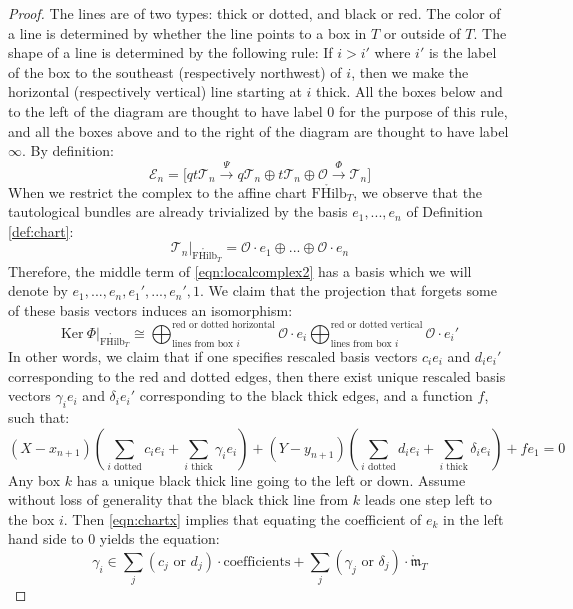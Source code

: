 \documentclass[12pt]{amsart}
\numberwithin{equation}{section}
\theoremstyle{definition}
\theoremstyle{remark}
\newcommand{\CE}{\mathcal{E}}
\newcommand{\CO}{\mathcal{O}}
\newcommand{\CT}{\mathcal{T}}
\renewcommand{\1}{\mathbf{1}}
\newcommand{\FH}{\mathrm{FHilb}}
\newcommand{\oFH}{\mathring{\FH}}
\newcommand{\fm}{\mathfrak{m}}
\newcommand{\ofm}{\mathring{\fm}}
\newcommand{\Ker}{\text{Ker}}
\begin{document}
\begin{proof}

\noindent The lines are of two types: thick or dotted, and black or red. The color of a line is determined by whether the line points to a box in $T$ or outside of $T$. The shape of a line is determined by the following rule: If $i>i'$ where $i'$ is the label of the box to the southeast (respectively northwest) of $i$, then we make the horizontal (respectively vertical) line starting at $i$ thick. All the boxes below and to the left of the diagram are thought to have label $0$ for the purpose of this rule, and all the boxes above and to the right of the diagram are thought to have label $\infty$. By definition:
\begin{equation}
\label{eqn:localcomplex2}
\CE_n = \Big[ qt\CT_{n} \stackrel{\Psi}\longrightarrow q \CT_n \oplus t \CT_n \oplus \CO \stackrel{\Phi}\longrightarrow \CT_n \Big]
\end{equation}
When we restrict the complex to the affine chart $\oFH_T$, we observe that the tautological bundles are already trivialized by the basis $e_1,...,e_n$ of Definition \ref{def:chart}:
$$
\CT_n |_{\oFH_T} = \CO \cdot e_1 \oplus ... \oplus \CO \cdot e_n
$$
Therefore, the middle term of \eqref{eqn:localcomplex2} has a basis which we will denote by $e_1,...,e_n, e_1',...,e_n',1$. We claim that the projection that forgets some of these basis vectors induces an isomorphism:
\begin{equation}
\label{eqn:localkernel}
\Ker \ \Phi|_{\oFH_T} \cong \bigoplus^{\text{red or dotted horizontal}}_{\text{lines from box }i} \CO \cdot e_i \bigoplus^{\text{red or dotted vertical}}_{\text{lines from box }i} \CO \cdot e_i'
\end{equation}
In other words, we claim that if one specifies rescaled basis vectors $c_i e_i$ and $d_i e_i'$ corresponding to the red and dotted edges, then there exist unique rescaled basis vectors $\gamma_i e_i$ and $\delta_i e_i'$ corresponding to the black thick edges, and a function $f$, such that:
$$
(X-x_{n+1})\left(\sum_{i\text{ dotted}} c_i e_i + \sum_{i\text{ thick}} \gamma_i e_i \right) + (Y-y_{n+1})\left(\sum_{i\text{ dotted}} d_i e_i + \sum_{i\text{ thick}} \delta_i e_i \right) + f e_1 = 0
$$
Any box $k$ has a unique black thick line going to the left or down. Assume without loss of generality that the black thick line from $k$ leads one step left to the box $i$. Then \eqref{eqn:chartx} implies that equating the coefficient of $e_k$ in the left hand side to 0 yields the equation:
$$
\gamma_i \in \sum_j (c_j \text{ or } d_j) \cdot \text{coefficients} + \sum_j (\gamma_j \text{ or }\delta_j) \cdot \ofm_T
$$
\end{proof}
\end{document}
